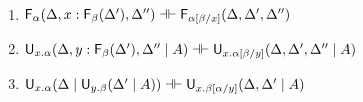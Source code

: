 \begin{lemma}[Fusion] ~ %
\begin{enumerate} 

\item $\mathsf{F}_{\alpha}(\Delta,x:\mathsf{F}_{\beta}(\Delta'),\Delta'') \dashv \vdash
  \mathsf{F}_{\alpha[\beta/x]}(\Delta,\Delta',\Delta'')$

\item $\mathsf{U}_{x.\alpha}(\Delta,y:\mathsf{F}_{\beta}(\Delta'),\Delta'' \mid A) \dashv \vdash
  \mathsf{U}_{x.\alpha[\beta/y]}(\Delta,\Delta',\Delta'' \mid A)$

\item 
$\mathsf{U}_{x.\alpha}(\Delta \mid \mathsf{U}_{y.\beta}(\Delta' \mid A)) \dashv \vdash
 \mathsf{U}_{x.\beta[\alpha/y]}(\Delta,\Delta' \mid A)$

\end{enumerate}
\end{lemma}

